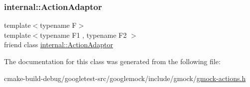 \mbox{\label{classtesting_1_1Action_a66fe4f9c9b9d020273151aa6054b491e}} 
\subsubsection{\texorpdfstring{internal::ActionAdaptor}{internal::ActionAdaptor}}
{\footnotesize\ttfamily template$<$typename F$>$ \\
template$<$typename F1 , typename F2 $>$ \\
friend class \mbox{\hyperlink{classtesting_1_1internal_1_1ActionAdaptor}{internal\+::\+Action\+Adaptor}}\hspace{0.3cm}{\ttfamily [friend]}}



The documentation for this class was generated from the following file\+:\begin{DoxyCompactItemize}
\item 
cmake-\/build-\/debug/googletest-\/src/googlemock/include/gmock/\mbox{\hyperlink{gmock-actions_8h}{gmock-\/actions.\+h}}\end{DoxyCompactItemize}
